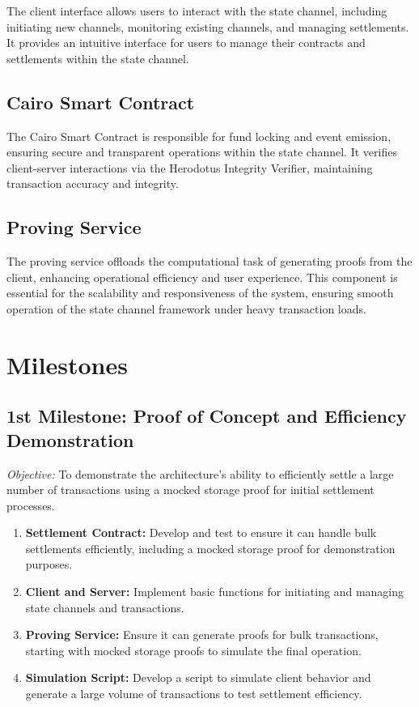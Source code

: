 \documentclass[11pt,a4paper]{article}
\begin{document}
The client interface allows users to interact with the state channel, including initiating new channels, monitoring existing channels, and managing settlements. It provides an intuitive interface for users to manage their contracts and settlements within the state channel.

\subsection*{Cairo Smart Contract}

The Cairo Smart Contract is responsible for fund locking and event emission, ensuring secure and transparent operations within the state channel. It verifies client-server interactions via the Herodotus Integrity Verifier, maintaining transaction accuracy and integrity.

\subsection*{Proving Service}

The proving service offloads the computational task of generating proofs from the client, enhancing operational efficiency and user experience. This component is essential for the scalability and responsiveness of the system, ensuring smooth operation of the state channel framework under heavy transaction loads.

\section*{Milestones}

\subsection*{1st Milestone: Proof of Concept and Efficiency Demonstration}

\textit{Objective:} To demonstrate the architecture's ability to efficiently settle a large number of transactions using a mocked storage proof for initial settlement processes.

\begin{enumerate}
    \item \textbf{Settlement Contract:} Develop and test to ensure it can handle bulk settlements efficiently, including a mocked storage proof for demonstration purposes.
    \item \textbf{Client and Server:} Implement basic functions for initiating and managing state channels and transactions.
    \item \textbf{Proving Service:} Ensure it can generate proofs for bulk transactions, starting with mocked storage proofs to simulate the final operation.
    \item \textbf{Simulation Script:} Develop a script to simulate client behavior and generate a large volume of transactions to test settlement efficiency.
\end{enumerate}
\end{document}
